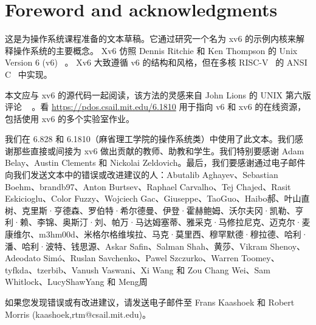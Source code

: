 \documentclass[UTF8]{article}
\begin{document}
   \chapter*{Foreword and acknowledgments}     

这是为操作系统课程准备的文本草稿。它通过研究一个名为 xv6 的示例内核来解释操作系统的主要概念。 Xv6 仿照 Dennis Ritchie 和 Ken Thompson 的 Unix Version 6 (v6)~    \cite{unix}    。 Xv6 大致遵循 v6 的结构和风格，但在多核 RISC-V~    \cite{riscv}    的 ANSI C~    \cite{kernighan}    中实现。  

本文应与 xv6 的源代码一起阅读，该方法的灵感来自 John Lions 的 UNIX 第六版评论 ~    \cite{lions}    。看
    \url{https://pdos.csail.mit.edu/6.1810}    用于指向 v6 和 xv6 的在线资源，包括使用 xv6 的多个实验室作业。  

我们在 6.828 和 6.1810（麻省理工学院的操作系统类）中使用了此文本。我们感谢那些直接或间接为 xv6 做出贡献的教师、助教和学生。我们特别要感谢 Adam Belay、Austin Clements 和 Nickolai Zeldovich。最后，我们要感谢通过电子邮件向我们发送文本中的错误或改进建议的人：Abutalib Aghayev、Sebastian Boehm、brandb97、Anton Burtsev、Raphael Carvalho、Tej Chajed、Rasit Eskicioglu、Color Fuzzy、Wojciech Gac、Giuseppe、TaoGuo、Haibo郝、叶山直树、克里斯·亨德森、罗伯特·希尔德曼、伊登·霍赫鲍姆、沃尔夫冈·凯勒、亨利·赖、李锦、奥斯汀·刘、帕万·马达姆塞蒂、雅采克·马修拉尼克、迈克尔·麦康维尔、m3hm00d、米格尔格维埃拉、马克·莫里西、穆罕默德·穆拉德、哈利·潘、哈利·波特、钱思源、Askar Safin、Salman Shah、黄莎、Vikram Shenoy、Adeodato Simó、Ruslan Savchenko、Pawel Szczurko、Warren Toomey、tyfkda、tzerbib、Vanush Vaswani、Xi Wang 和 Zou Chang Wei、Sam Whitlock、LucyShawYang 和 Meng周  

如果您发现错误或有改进建议，请发送电子邮件至 Frans Kaashoek 和 Robert Morris (kaashoek,rtm@csail.mit.edu)。  
\end{document}
